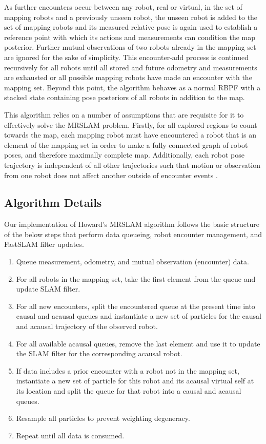 As further encounters occur between any robot, real or virtual, in the set of mapping robots and a previously unseen robot, the unseen robot is added to the set of mapping robots and its measured relative pose is again used to establish a reference point with which its actions and measurements can condition the map posterior. Further mutual observations of two robots already in the mapping set are ignored for the sake of simplicity. This encounter-add process is continued recursively for all robots until all stored and future odometry and measurements are exhausted or all possible mapping robots have made an encounter with the mapping set. Beyond this point, the algorithm behaves as a normal RBPF with a stacked state containing pose posteriors of all robots in addition to the map.


This algorithm relies on a number of assumptions that are requisite for it to effectively solve the MRSLAM problem. Firstly, for all explored regions to count towards the map, each mapping robot must have encountered a robot that is an element of the mapping set in order to make a fully connected graph of robot poses, and therefore maximally complete map. Additionally, each robot pose trajectory is independent of all other trajectories such that motion or observation from one robot does not affect another outside of encounter events \cite{howard2006multi}.

\subsection{Algorithm Details}
\label{SS:Alg:Details}
Our implementation of Howard's MRSLAM algorithm follows the basic structure of the below steps that perform data queueing, robot encounter management, and FastSLAM filter updates.
\begin{enumerate}
\item Queue measurement, odometry, and mutual observation (encounter) data.
\item For all robots in the mapping set, take the first element from the queue and update SLAM filter.
\item For all new encounters, split the encountered queue at the present time into causal and acausal queues and instantiate a new set of particles for the causal and acausal trajectory of the observed robot.
\item For all available acausal queues, remove the last element and use it to update the SLAM filter for the corresponding acausal robot.
\item If data includes a prior encounter with a robot not in the mapping set, instantiate a new set of particle for this robot and its acausal virtual self at its location and split the queue for that robot into a causal and acausal queues.
\item Resample all particles to prevent weighting degeneracy.
\item Repeat until all data is consumed.
\end{enumerate}
\vspace{0.1in}
